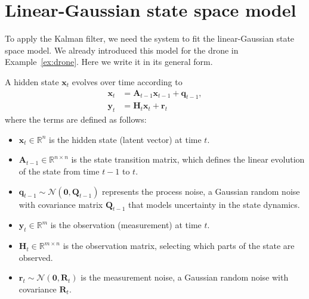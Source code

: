 
\section{Linear-Gaussian state space model}
To apply the Kalman filter, we need the system to fit the linear-Gaussian state space model. We already introduced this model for the drone in Example~\ref{ex:drone}. Here we write it in its general form.

A hidden state $\mathbf{x}_t$ evolves over time according to  
\begin{equation}\label{eq:linear ssm}
    \begin{aligned} 
    \mathbf{x}_t &= \mathbf{A}_{t-1}\mathbf{x}_{t-1}+\mathbf{q}_{t-1}, \\
    \mathbf{y}_t &= \mathbf{H}_t\mathbf{x}_t+\mathbf{r}_t
    \end{aligned}
\end{equation}
where the terms are defined as follows: 
\begin{itemize}
    \item $\mathbf{x}_t\in\mathbb R^n$ is the hidden state (latent vector) at time $t$.
    \item $\mathbf{A}_{t-1}\in\mathbb R^{n\times n}$ is the state transition matrix, which defines the linear evolution of the state from time $t-1$ to $t$.
    \item $\mathbf{q}_{t-1}\sim \mathcal N(\mathbf{0},\mathbf{Q}_{t-1})$ represents the process noise, a Gaussian random noise with covariance matrix $\mathbf{Q}_{t-1}$ that models uncertainty in the state dynamics. 
    \item $\mathbf{y}_t\in\mathbb R^m$ is the observation (measurement) at time $t$.
    \item $\mathbf{H}_t\in\mathbb R^{m\times n}$ is the observation matrix, selecting which parts of the state are observed.
    \item $\mathbf{r}_t\sim \mathcal N(\mathbf{0},\mathbf{R}_t)$ is the measurement noise, a Gaussian random noise with covariance $\mathbf{R}_t$. 
\end{itemize}


